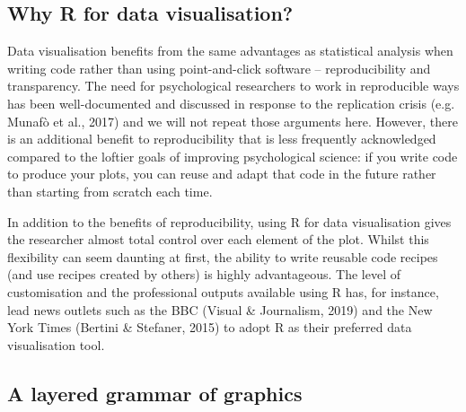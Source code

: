 \documentclass[
  english,
  doc,floatsintext]{apa6}
\begin{document}
\hypertarget{why-r-for-data-visualisation}{%
\subsection{Why R for data visualisation?}\label{why-r-for-data-visualisation}}

Data visualisation benefits from the same advantages as statistical analysis when writing code rather than using point-and-click software -- reproducibility and transparency. The need for psychological researchers to work in reproducible ways has been well-documented and discussed in response to the replication crisis (e.g. Munafò et al., 2017) and we will not repeat those arguments here. However, there is an additional benefit to reproducibility that is less frequently acknowledged compared to the loftier goals of improving psychological science: if you write code to produce your plots, you can reuse and adapt that code in the future rather than starting from scratch each time.

In addition to the benefits of reproducibility, using R for data visualisation gives the researcher almost total control over each element of the plot. Whilst this flexibility can seem daunting at first, the ability to write reusable code recipes (and use recipes created by others) is highly advantageous. The level of customisation and the professional outputs available using R has, for instance, lead news outlets such as the BBC (Visual \& Journalism, 2019) and the New York Times (Bertini \& Stefaner, 2015) to adopt R as their preferred data visualisation tool.

\hypertarget{a-layered-grammar-of-graphics}{%
\subsection{A layered grammar of graphics}\label{a-layered-grammar-of-graphics}}
\end{document}
